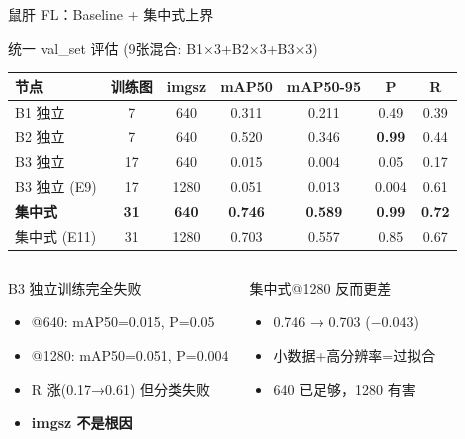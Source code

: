 \documentclass[aspectratio=169, 10pt]{beamer}
\begin{document}
\begin{frame}{鼠肝 FL：Baseline + 集中式上界}
  \begin{block}{统一 val\_set 评估 (9张混合: B1×3+B2×3+B3×3)}
    \begin{tabular}{lcccccc}
      \toprule
      \textbf{节点} & \textbf{训练图} & \textbf{imgsz} & \textbf{mAP50} & \textbf{mAP50-95} & \textbf{P} & \textbf{R} \\
      \midrule
      B1 独立 & 7 & 640 & 0.311 & 0.211 & 0.49 & 0.39 \\
      B2 独立 & 7 & 640 & 0.520 & 0.346 & \textbf{0.99} & 0.44 \\
      B3 独立 & 17 & 640 & \alert{0.015} & \alert{0.004} & 0.05 & 0.17 \\
      B3 独立 (E9) & 17 & 1280 & \alert{0.051} & \alert{0.013} & 0.004 & 0.61 \\
      \textbf{集中式} & \textbf{31} & \textbf{640} & \textbf{0.746} & \textbf{0.589} & \textbf{0.99} & \textbf{0.72} \\
      集中式 (E11) & 31 & 1280 & 0.703 & 0.557 & 0.85 & 0.67 \\
      \bottomrule
    \end{tabular}
  \end{block}
  \vspace{0em}
  \begin{columns}[T]
    \begin{alertblock}{B3 独立训练完全失败}
      \begin{itemize}
        \item @640: mAP50=0.015, P=0.05
        \item @1280: mAP50=0.051, P=0.004
        \item R 涨(0.17→0.61) 但分类失败
        \item \textbf{imgsz 不是根因}
      \end{itemize}
    \end{alertblock}
    \begin{alertblock}{集中式@1280 反而更差}
      \begin{itemize}
        \item 0.746 → 0.703 ($-$0.043)
        \item 小数据+高分辨率=过拟合
        \item 640 已足够，1280 有害
      \end{itemize}
    \end{alertblock}
  \end{columns}
\end{frame}
\end{document}
